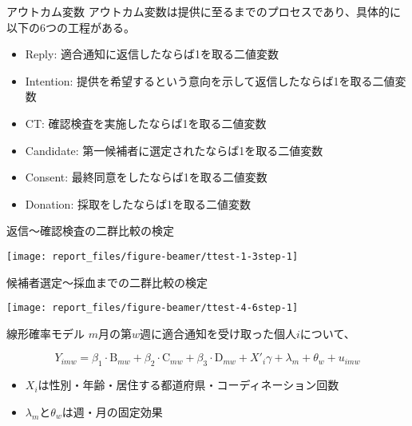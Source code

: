 \documentclass[
      aspectratio=169,
        12pt,
    ]{beamer}
\providecommand{\tightlist}{%
  \setlength{\itemsep}{0pt}\setlength{\parskip}{0pt}}
\begin{document}
\begin{frame}{アウトカム変数}
\protect\hypertarget{ux30a2ux30a6ux30c8ux30abux30e0ux5909ux6570}{}
アウトカム変数は提供に至るまでのプロセスであり、具体的に以下の6つの工程がある。

\begin{itemize}
\tightlist
\item
  Reply: 適合通知に返信したならば1を取る二値変数
\item
  Intention: 提供を希望するという意向を示して返信したならば1を取る二値変数
\item
  CT: 確認検査を実施したならば1を取る二値変数
\item
  Candidate: 第一候補者に選定されたならば1を取る二値変数
\item
  Consent: 最終同意をしたならば1を取る二値変数
\item
  Donation: 採取をしたならば1を取る二値変数
\end{itemize}
\end{frame}

\begin{frame}{返信～確認検査の二群比較の検定}
\protect\hypertarget{ux8fd4ux4fe1ux78baux8a8dux691cux67fbux306eux4e8cux7fa4ux6bd4ux8f03ux306eux691cux5b9a}{}
\begin{center}\texttt{[image: report\_files/figure-beamer/ttest-1-3step-1]} \end{center}
\end{frame}

\begin{frame}{候補者選定～採血までの二群比較の検定}
\protect\hypertarget{ux5019ux88dcux8005ux9078ux5b9aux63a1ux8840ux307eux3067ux306eux4e8cux7fa4ux6bd4ux8f03ux306eux691cux5b9a}{}
\begin{center}\texttt{[image: report\_files/figure-beamer/ttest-4-6step-1]} \end{center}
\end{frame}

\begin{frame}{線形確率モデル}
\protect\hypertarget{ux7ddaux5f62ux78baux7387ux30e2ux30c7ux30eb}{}
\(m\)月の第\(w\)週に適合通知を受け取った個人\(i\)について、

\[
  Y_{imw} =
  \beta_1 \cdot \text{B}_{mw} + \beta_2 \cdot \text{C}_{mw}
  + \beta_3 \cdot \text{D}_{mw}
  + X'_i \gamma + \lambda_m + \theta_w + u_{imw}
\]

\begin{itemize}
\tightlist
\item
  \(X_i\)は性別・年齢・居住する都道府県・コーディネーション回数
\item
  \(\lambda_m\)と\(\theta_w\)は週・月の固定効果
\end{itemize}
\end{frame}
\end{document}
